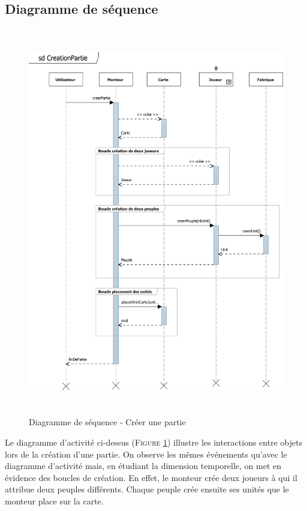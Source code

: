 \documentclass[a4paper,11pt]{article}
\begin{document}
\subsection{Diagramme de séquence}
\begin{figure}[ht!]
\includegraphics[height=17cm]{sqCreerPartie.png}
\caption{Diagramme de séquence - Créer une partie}
\label{fig:seqcreer}
\end{figure}
\vspace*{1cm}
Le diagramme d'activité ci-dessus (\textsc{Figure \ref{fig:seqcreer}}) illustre les interactions entre objets lors de la création d'une partie. On observe les mêmes événements qu'avec le diagramme d'activité mais, en étudiant la dimension temporelle, on met en évidence des boucles de création. En effet, le monteur crée deux joueurs à qui il attribue deux peuples différents. Chaque peuple crée ensuite ses unités que le monteur place sur la carte.
\newpage 
\end{document}
